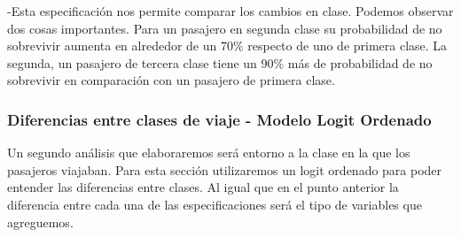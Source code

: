 \documentclass[
]{article}
\begin{document}
-Esta especificación nos permite comparar los cambios en clase. Podemos
observar dos cosas importantes. Para un pasajero en segunda clase su
probabilidad de no sobrevivir aumenta en alrededor de un 70\% respecto
de uno de primera clase. La segunda, un pasajero de tercera clase tiene
un 90\% más de probabilidad de no sobrevivir en comparación con un
pasajero de primera clase.

\hypertarget{diferencias-entre-clases-de-viaje---modelo-logit-ordenado}{%
\subsubsection{Diferencias entre clases de viaje - Modelo Logit
Ordenado}\label{diferencias-entre-clases-de-viaje---modelo-logit-ordenado}}

Un segundo análisis que elaboraremos será entorno a la clase en la que
los pasajeros viajaban. Para esta sección utilizaremos un logit ordenado
para poder entender las diferencias entre clases. Al igual que en el
punto anterior la diferencia entre cada una de las especificaciones será
el tipo de variables que agreguemos.
\end{document}
